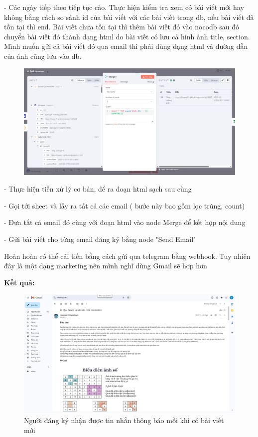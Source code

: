 - Các ngày tiếp theo tiếp tục cào. Thực hiện kiểm tra xem có bài viết mới hay không bằng cách so sánh id của bài viết với các bài viết trong db, nếu bài viết đã tồn tại thì end. Bài viết chưa tồn tại thì thêm bài viết đó vào nocodb sau đó chuyển bài viết đó thành dạng html do bài viết có lưu cả hình ảnh title, section. Mình muốn gửi cả bài viết đó qua email thì phải dùng dạng html và đường dẫn của ảnh cũng lưu vào db. 

\begin{figure}[htbp]
    \centering
    \includegraphics[width=1\linewidth]{Chap1-7/merge-project.pdf}
\end{figure}

\newpage

- Thực hiện tiền xử lý cơ bản, để ra đoạn html sạch sau cùng

- Gọi tới sheet và lấy ra tất cả các email ( bước này bao gồm lọc trùng, count)

- Đưa tất cả email đó cùng với đoạn html vào node Merge để kết hợp nội dung

- Gửi bài viết cho từng email đăng ký bằng node "Send Email"

Hoàn hoàn có thể cải tiến bằng cách gửi qua telegram bằng webhook. Tuy nhiên đây là một dạng marketing nên mình nghĩ dùng Gmail sẽ hợp hơn

\newpage

\textbf{Kết quả: }

\begin{figure}[htbp]
    \centering
    \includegraphics[width=1\linewidth]{Chap1-7/glutis-subcriber-results.pdf}
    \caption{Người đăng ký nhận được tin nhắn thông báo mỗi khi có bài viết mới}
\end{figure}

